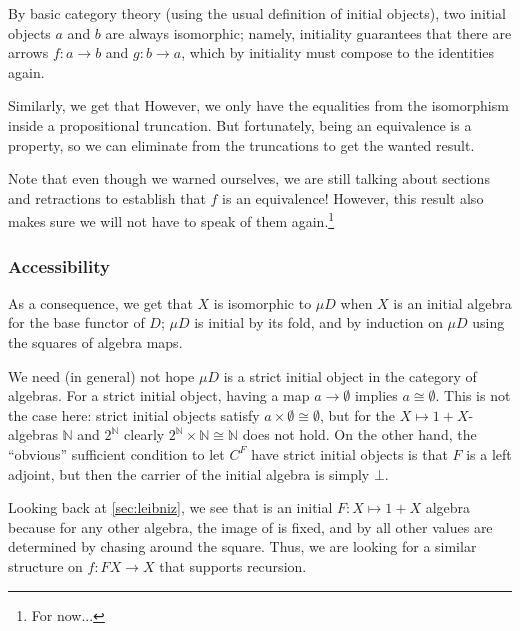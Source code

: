 By basic category theory (using the usual definition of initial objects), two initial objects $a$ and $b$ are always isomorphic;
namely, initiality guarantees that there are arrows $f : a \to b$ and $g : b \to a$, which by initiality must compose to the identities again.

Similarly, we get that
However, we only have the equalities from the isomorphism inside a propositional truncation. But fortunately, being an equivalence is a property, so we can eliminate from the truncations to get the wanted result.

Note that even though we warned ourselves, we are still talking about sections and retractions to establish that $f$ is an equivalence! However, this result also makes sure we will not have to speak of them again.\footnote{For now...}

\subsubsection{Accessibility}
As a consequence, we get that $X$ is isomorphic to $\mu D$ when $X$ is an initial algebra for the base functor of $D$; $\mu D$ is initial by its fold, and by induction on $\mu D$ using the squares of algebra maps. 

\begin{remark}
    We need (in general) not hope $\mu D$ is a strict initial object in the category of algebras. For a strict initial object, having a map $a \to \emptyset$ implies $a \cong \emptyset$. This is not the case here: strict initial objects satisfy $a \times \emptyset \cong \emptyset$, but for the $X \mapsto 1 + X$-algebras $\mathbb{N}$ and $2^\mathbb{N}$ clearly $2^\mathbb{N} \times \mathbb{N} \cong \mathbb{N}$ does not hold. On the other hand, the ``obvious'' sufficient condition to let $C^F$ have strict initial objects is that $F$ is a left adjoint, but then the carrier of the initial algebra is simply $\bot$.
\end{remark}

Looking back at \autoref{sec:leibniz}, we see that  is an initial $F: X \mapsto 1 + X$ algebra because for any other algebra, the image of  is fixed, and by  all other values are determined by chasing around the square. Thus, we are looking for a similar structure on $f : FX \to X$ that supports recursion.

